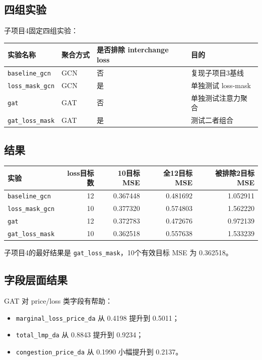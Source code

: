 \documentclass[UTF8]{ctexart}
\begin{document}
\subsection{四组实验}

子项目4固定四组实验：

\begin{center}
\begin{tabular}{llll}
\toprule
实验名称 & 聚合方式 & 是否排除 interchange loss & 目的 \\
\midrule
\texttt{baseline\_gcn} & GCN & 否 & 复现子项目3基线 \\
\texttt{loss\_mask\_gcn} & GCN & 是 & 单独测试 loss-mask \\
\texttt{gat} & GAT & 否 & 单独测试注意力聚合 \\
\texttt{gat\_loss\_mask} & GAT & 是 & 测试二者组合 \\
\bottomrule
\end{tabular}
\end{center}

\subsection{结果}

\begin{center}
\begin{tabular}{lrrrr}
\toprule
实验 & loss目标数 & 10目标MSE & 全12目标MSE & 被排除2目标MSE \\
\midrule
\texttt{baseline\_gcn} & 12 & 0.367448 & 0.481692 & 1.052911 \\
\texttt{loss\_mask\_gcn} & 10 & 0.377320 & 0.574803 & 1.562220 \\
\texttt{gat} & 12 & 0.372783 & 0.472676 & 0.972139 \\
\texttt{gat\_loss\_mask} & 10 & 0.362518 & 0.557638 & 1.533239 \\
\bottomrule
\end{tabular}
\end{center}

子项目4的最好结果是 \texttt{gat\_loss\_mask}，10个有效目标 MSE 为 0.362518。

\subsection{字段层面结果}

GAT 对 price/loss 类字段有帮助：
\begin{itemize}
    \item \texttt{marginal\_loss\_price\_da} 从 0.4198 提升到 0.5011；
    \item \texttt{total\_lmp\_da} 从 0.8843 提升到 0.9234；
    \item \texttt{congestion\_price\_da} 从 0.1990 小幅提升到 0.2137。
\end{itemize}
\end{document}
